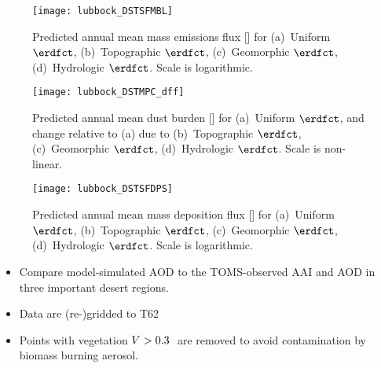 \documentclass[final,dvips]{foils}
\begin{document}
\rotatefoilhead{\bgl
\Large\textcolor{blue}{\hfill Mobilization \hfill}}\vspace{-0.5in}\large
\begin{figure}
\centering %
\texttt{[image: lubbock\_DSTSFMBL]}\vfill
\caption{
Predicted annual mean mass emissions flux [\ugxmSs] for
(a)~Uniform $\erdfct$, (b)~Topographic $\erdfct$,
(c)~Geomorphic $\erdfct$, (d)~Hydrologic $\erdfct$.
Scale is logarithmic.
\label{fgr:DSTSFMBL}}
\end{figure}

\rotatefoilhead{\bgl
\Large\textcolor{blue}{\hfill Column Mass Path \hfill}}\vspace{-0.5in}\large
\begin{figure}
\centering %
\texttt{[image: lubbock\_DSTMPC\_dff]}\vfill
\caption{
Predicted annual mean dust burden [\mgxmS] for
(a)~Uniform $\erdfct$, and change relative to (a) due to
(b)~Topographic $\erdfct$, (c)~Geomorphic $\erdfct$,
(d)~Hydrologic $\erdfct$. 
Scale is non-linear.
\label{plt:DSTMPC}}
\end{figure}

\rotatefoilhead{\bgl
\Large\textcolor{blue}{\hfill Deposition \hfill}}\vspace{-0.5in}\large
\begin{figure}
\centering %
\texttt{[image: lubbock\_DSTSFDPS]}\vfill
\caption{
Predicted annual mean mass deposition flux [\ugxmSs] for
(a)~Uniform $\erdfct$, (b)~Topographic $\erdfct$,
(c)~Geomorphic $\erdfct$, (d)~Hydrologic $\erdfct$.
Scale is logarithmic.
\label{fgr:DSTSFDPS}}
\end{figure}

\rotatefoilhead{\bgl
\Large\textcolor{blue}{\hfill Spatial Correlation \hfill}}\vspace{-0.5in}\large
\begin{itemize}
\item Compare model-simulated AOD to the TOMS-observed AAI and AOD
in three important desert regions.
\item Data are (re-)gridded to T62 
\item Points with vegetation $V > 0.3$\,\mSxmS\ are removed to avoid
  contamination by biomass burning aerosol. 
\end{itemize}
\end{document}
